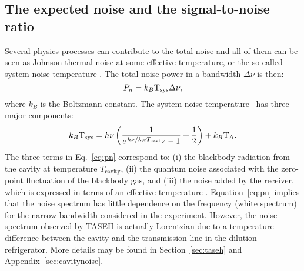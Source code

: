 \subsection{The expected noise and the signal-to-noise ratio}
\label{sec:intronoise}
Several physics processes can contribute to the total noise and all of them 
can be seen as Johnson thermal noise at some effective temperature, or the 
so-called system noise temperature \tsys. The total noise power in a 
bandwidth $\Delta\nu$ is then:
\begin{equation}
  P_n = k_B\text{T}_\text{sys}\Delta\nu, 
\end{equation}
where $k_B$ is the Boltzmann constant. 
The system noise temperature \tsys\ has three major components: 
\begin{equation}
  k_B\text{T}_\text{sys} = h\nu\left(\frac{1}{e^{\left.h\nu\right/k_{B}T_\mathrm{cavity}}-1} + \frac{1}{2} \right) + k_B\text{T}_\text{A}. 
\label{eq:pn}
\end{equation}
 The three terms in Eq.~\eqref{eq:pn} correspond to: (i) the blackbody radiation 
from the cavity at temperature $T_\mathrm{cavity}$, (ii) the quantum noise 
associated with the zero-point fluctuation of the blackbody gas, and (iii) the 
noise added by the receiver, which is expressed in terms of an effective 
temperature \ta. Equation~\eqref{eq:pn} implies 
that the noise spectrum has little dependence on the frequency 
(white spectrum) for the narrow bandwidth considered in the experiment. 
However, the noise spectrum observed by TASEH 
is actually Lorentzian due to a temperature difference between the cavity 
and the transmission line in the dilution refrigerator. More details may be 
found in Section~\ref{sec:taseh} and Appendix~\ref{sec:cavitynoise}. 

